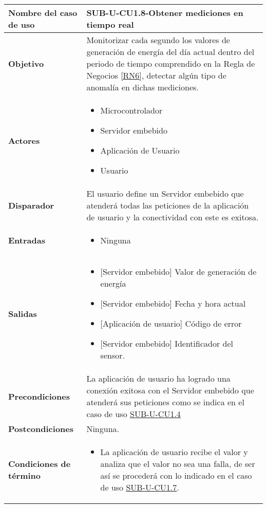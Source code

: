 \begin{longtable}{|J{5cm}|J{10.3cm}|}
	\hline
	\textbf{Nombre del caso de uso} &
		SUB-U-CU1.8-Obtener mediciones en tiempo real \\ \hline
	\textbf{Objetivo} &
		Monitorizar cada segundo los valores de generación de energía del día actual dentro del periodo de tiempo comprendido en la Regla de Negocios \ref{RN6}, detectar algún tipo de anomalía en dichas mediciones. \\ \hline
	\textbf{Actores} &
		\begin{itemize}
		    \item Microcontrolador
			\item Servidor embebido
			\item Aplicación de Usuario
		    \item Usuario
		\end{itemize} \\ \hline
	\textbf{Disparador} & 
	    El usuario define un Servidor embebido que atenderá todas las peticiones de la aplicación de usuario y la conectividad con este es exitosa.\\ \hline 
	\textbf{Entradas} & 
		\begin{itemize}
				\item Ninguna
		\end{itemize}\\ \hline 
	\textbf{Salidas} & 
		\begin{itemize}
			\item{[Servidor embebido]} Valor de generación de energía
			\item{[Servidor embebido]} Fecha y hora actual
			\item{[Aplicación de usuario]} Código de error
			\item{[Servidor embebido]} Identificador del sensor.
		\end{itemize} \\ \hline
	\textbf{Precondiciones} &
		La aplicación de usuario ha logrado una conexión exitosa con el Servidor embebido que atenderá sus peticiones como se indica en el caso de uso \hyperref[SUB-U-CU1.4]{SUB-U-CU1.4} \\ \hline
	\textbf{Postcondiciones} &
		Ninguna.\\ \hline
	\textbf{Condiciones de término} & 
		\begin{itemize}
			\item La aplicación de usuario recibe el valor y analiza que el valor no sea una falla, de ser así se procederá con lo indicado en el caso de uso \hyperref[SUB-U-CU1.7]{SUB-U-CU1.7}.

\end{itemize}
\end{longtable}
